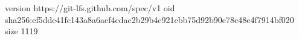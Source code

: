 version https://git-lfs.github.com/spec/v1
oid sha256:ef5dde41fc143a8a6aef4cdac2b29b4c921cbb75d92b90e78c48e4f7914bf020
size 1119
